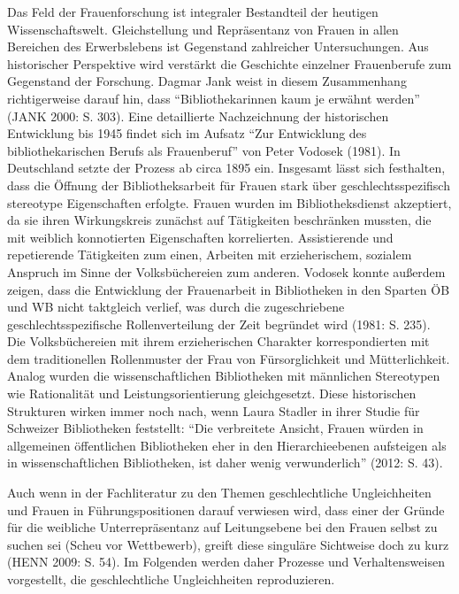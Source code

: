 \documentclass[a4paper,
fontsize=11pt,
oneside,
numbers=noperiodatend,
parskip=half-,
bibliography=totoc,
final
]{scrartcl}
\begin{document}
Das Feld der Frauenforschung ist integraler Bestandteil der heutigen
Wissenschaftswelt. Gleichstellung und Repräsentanz von Frauen in allen
Bereichen des Erwerbslebens ist Gegenstand zahlreicher Untersuchungen.
Aus historischer Perspektive wird verstärkt die Geschichte einzelner
Frauenberufe zum Gegenstand der Forschung. Dagmar Jank weist in diesem
Zusammenhang richtigerweise darauf hin, dass \enquote{Bibliothekarinnen
kaum je erwähnt werden} (JANK 2000: S. 303). Eine detaillierte
Nachzeichnung der historischen Entwicklung bis 1945 findet sich im
Aufsatz \enquote{Zur Entwicklung des bibliothekarischen Berufs als
Frauenberuf} von Peter Vodosek (1981). In Deutschland setzte der Prozess
ab circa 1895 ein. Insgesamt lässt sich festhalten, dass die Öffnung der
Bibliotheksarbeit für Frauen stark über geschlechtsspezifisch stereotype
Eigenschaften erfolgte. Frauen wurden im Bibliotheksdienst akzeptiert,
da sie ihren Wirkungskreis zunächst auf Tätigkeiten beschränken mussten,
die mit weiblich konnotierten Eigenschaften korrelierten. Assistierende
und repetierende Tätigkeiten zum einen, Arbeiten mit erzieherischem,
sozialem Anspruch im Sinne der Volksbüchereien zum anderen. Vodosek
konnte außerdem zeigen, dass die Entwicklung der Frauenarbeit in
Bibliotheken in den Sparten ÖB und WB nicht taktgleich verlief, was
durch die zugeschriebene geschlechtsspezifische Rollenverteilung der
Zeit begründet wird (1981: S. 235). Die Volksbüchereien mit ihrem
erzieherischen Charakter korrespondierten mit dem traditionellen
Rollenmuster der Frau von Fürsorglichkeit und Mütterlichkeit. Analog
wurden die wissenschaftlichen Bibliotheken mit männlichen Stereotypen
wie Rationalität und Leistungsorientierung gleichgesetzt. Diese
historischen Strukturen wirken immer noch nach, wenn Laura Stadler in
ihrer Studie für Schweizer Bibliotheken feststellt: \enquote{Die
verbreitete Ansicht, Frauen würden in allgemeinen öffentlichen
Bibliotheken eher in den Hierarchieebenen aufsteigen als in
wissenschaftlichen Bibliotheken, ist daher wenig verwunderlich} (2012:
S. 43).

Auch wenn in der Fachliteratur zu den Themen geschlechtliche
Ungleichheiten und Frauen in Führungspositionen darauf verwiesen wird,
dass einer der Gründe für die weibliche Unterrepräsentanz auf
Leitungsebene bei den Frauen selbst zu suchen sei (Scheu vor
Wettbewerb), greift diese singuläre Sichtweise doch zu kurz (HENN 2009:
S. 54). Im Folgenden werden daher Prozesse und Verhaltensweisen
vorgestellt, die geschlechtliche Ungleichheiten reproduzieren.
\end{document}
